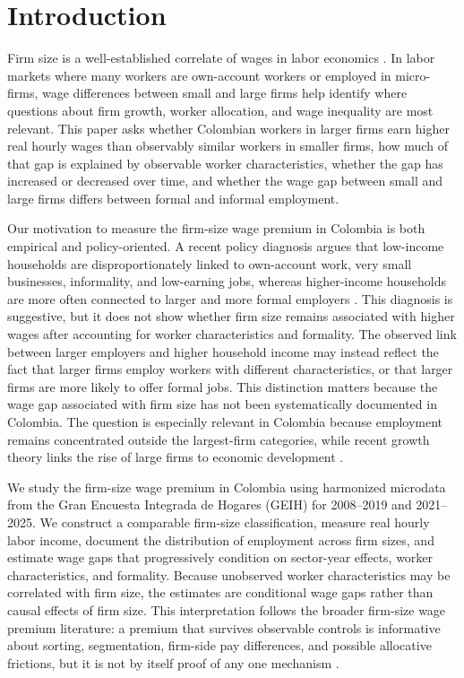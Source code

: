 \section{Introduction}

Firm size is a well-established correlate of wages in labor economics \citep{BrownMedoff1989,OiIdson1999,troske1999evidence}. In labor markets where many workers are own-account workers or employed in micro-firms, wage differences between small and large firms help identify where questions about firm growth, worker allocation, and wage inequality are most relevant. This paper asks whether Colombian workers in larger firms earn higher real hourly wages than observably similar workers in smaller firms, how much of that gap is explained by observable worker characteristics, whether the gap has increased or decreased over time, and whether the wage gap between small and large firms differs between formal and informal employment.

Our motivation to measure the firm-size wage premium in Colombia is both empirical and policy-oriented. A recent policy diagnosis argues that low-income households are disproportionately linked to own-account work, very small businesses, informality, and low-earning jobs, whereas higher-income households are more often connected to larger and more formal employers \citep{eslava2026crecimiento}. This diagnosis is suggestive, but it does not show whether firm size remains associated with higher wages after accounting for worker characteristics and formality. The observed link between larger employers and higher household income may instead reflect the fact that larger firms employ workers with different characteristics, or that larger firms are more likely to offer formal jobs. This distinction matters because the wage gap associated with firm size has not been systematically documented in Colombia. The question is especially relevant in Colombia because employment remains concentrated outside the largest-firm categories, while recent growth theory links the rise of large firms to economic development \citep{Chen2026}.

We study the firm-size wage premium in Colombia using harmonized microdata from the Gran Encuesta Integrada de Hogares (GEIH) for 2008--2019 and 2021--2025. We construct a comparable firm-size classification, measure real hourly labor income, document the distribution of employment across firm sizes, and estimate wage gaps that progressively condition on sector-year effects, worker characteristics, and formality. Because unobserved worker characteristics may be correlated with firm size, the estimates are conditional wage gaps rather than causal effects of firm size. This interpretation follows the broader firm-size wage premium literature: a premium that survives observable controls is informative about sorting, segmentation, firm-side pay differences, and possible allocative frictions, but it is not by itself proof of any one mechanism \citep{BrownMedoff1989,OiIdson1999,AbowdKramarzMargolis1999,CardHeiningKline2013,ElBadaouiStroblWalsh2010,BalkanTumen2016}.

